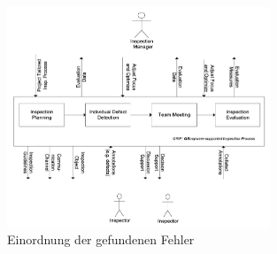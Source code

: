 \documentclass{llncs}
\begin{document}
\begin{figure}
	\centering
	\includegraphics[width=0.7\textwidth]{images/3_4_1.png}
	\caption{Einordnung der gefundenen Fehler}
	\label{fig:3_4_1_png}
\end{figure}
\end{document}
